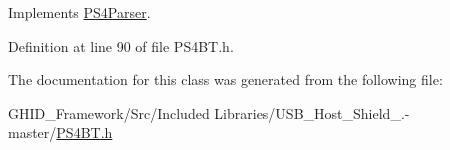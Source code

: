 \-Implements \hyperlink{class_p_s4_parser_a8788530b0c213dedfcf56b78e8ca4879}{\-P\-S4\-Parser}.



\-Definition at line 90 of file \-P\-S4\-B\-T.\-h.



\-The documentation for this class was generated from the following file\-:\begin{DoxyCompactItemize}
\item 
\-G\-H\-I\-D\-\_\-\-Framework/\-Src/\-Included Libraries/\-U\-S\-B\-\_\-\-Host\-\_\-\-Shield\-\_.-\/master/\hyperlink{_p_s4_b_t_8h}{\-P\-S4\-B\-T.\-h}\end{DoxyCompactItemize}
